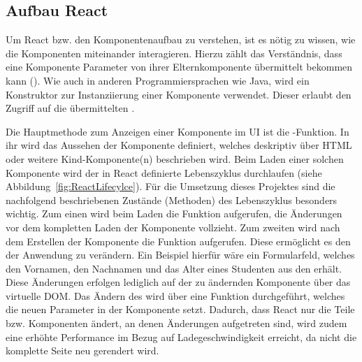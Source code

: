 
\subsection{Aufbau React}
\label{ssec:AufbauReact}

Um React bzw. den Komponentenaufbau zu verstehen, ist es nötig zu wissen, wie die Komponenten miteinander interagieren.
Hierzu zählt \ua das Verständnis, dass eine Komponente Parameter von ihrer Elternkomponente übermittelt bekommen kann (\props).
Wie auch in anderen Programmiersprachen wie \zb Java, wird ein Konstruktor  zur Instanziierung einer Komponente verwendet.
Dieser erlaubt den Zugriff auf die übermittelten \props.

Die Hauptmethode zum Anzeigen einer Komponente im \ac{UI} ist die \render-Funktion.
In ihr wird das Aussehen der Komponente definiert, welches deskriptiv über \acs{HTML} oder weitere Kind-Kompo\-nente(n) beschrieben wird.
Beim Laden einer solchen Komponente wird der in React definierte Lebenszyklus durchlaufen (siehe Abbildung~\ref{fig:ReactLifecylce}).
Für die Umsetzung dieses Projektes sind die nachfolgend beschriebenen Zustände (Methoden) des Lebenszyklus besonders wichtig.
Zum einen wird beim Laden die Funktion \cwm aufgerufen, die Änderungen vor dem kompletten Laden der Komponente vollzieht.
Zum zweiten wird nach dem Erstellen der Komponente die Funktion \cdm aufgerufen. %
Diese ermöglicht es \zb den \state der Anwendung zu verändern.
Ein Beispiel hierfür wäre ein Formularfeld, welches den Vornamen, den Nachnamen und das Alter eines Studenten aus den \props erhält.
Diese Änderungen erfolgen lediglich auf der zu ändernden Komponente über das virtuelle \ac{DOM}.
Das Ändern des \state wird über eine Funktion \exampleState durchgeführt, welches die neuen Parameter in der Komponente setzt.
Dadurch, dass React nur die Teile bzw. Komponenten ändert, an denen Änderungen aufgetreten sind, wird zudem eine erhöhte Performance im Bezug auf Ladegeschwindigkeit erreicht, da nicht die komplette Seite neu gerendert wird.

